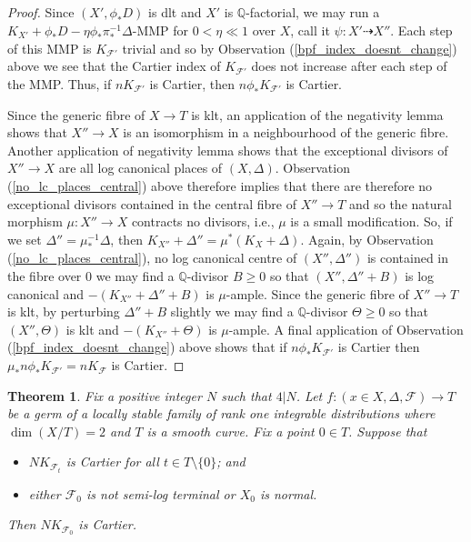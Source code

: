 \documentclass[12pt, a4paper]{amsart}
\newcounter{Theorem}
\newtheorem{theorem}{Theorem}[section]
\theoremstyle{definition}
\theoremstyle{named}
\begin{document}
\begin{proof}
Since $(X', \phi_*D)$ is dlt and $X'$ is $\mathbb Q$-factorial, 
we may run a $K_{X'}+\phi_*D - \eta\phi_*\pi_*^{-1}\Delta$-MMP for $0<\eta \ll 1$ over $X$, call it 
$\psi\colon X' \dashrightarrow X''$.  Each step of this MMP is $K_{\mathcal F'}$ trivial and so by Observation  (\ref{bpf_index_doesnt_change}) above we see that the Cartier index of $K_{\mathcal F'}$ does not increase after each step of the MMP.  Thus, if $nK_{\mathcal F'}$ is Cartier, then $n\phi_*K_{\mathcal F'}$ is Cartier.

Since the generic fibre of $X \to T$ is klt, an application of the negativity lemma shows that $X'' \to X$ is an isomorphism in a neighbourhood of the generic fibre.  Another application of negativity lemma shows that the exceptional divisors of $X'' \to X$ are all log canonical places of $(X, \Delta)$.  Observation (\ref{no_lc_places_central}) above therefore implies that there are therefore no exceptional divisors contained in the central fibre of $X'' \to T$ and so the natural morphism $\mu\colon X'' \to X$ contracts no divisors, i.e., $\mu$ is a small modification.  
So, if we set $\Delta'' = \mu_*^{-1}\Delta$, then $K_{X''}+\Delta'' = \mu^*(K_X+\Delta)$.  Again, by Observation (\ref{no_lc_places_central}), no log canonical centre of $(X'', \Delta'')$ is contained in the fibre over $0$ we may find a $\mathbb Q$-divisor $B \ge 0$ so that $(X'', \Delta''+B)$ is log canonical and $-(K_{X''}+\Delta''+B)$ is $\mu$-ample.  Since the generic fibre of $X'' \to T$ is klt, by perturbing $\Delta''+B$ slightly we may find a $\mathbb Q$-divisor $\Theta \ge 0$ so that $(X'', \Theta)$ is klt and $-(K_{X''}+\Theta)$ is $\mu$-ample.
A final application of Observation (\ref{bpf_index_doesnt_change}) above
shows that if $n\phi_*K_{\mathcal F'}$ is Cartier then 
$\mu_*n\phi_*K_{\mathcal F'} = nK_{\mathcal F}$ is Cartier.
\end{proof}







\begin{theorem}
\label{thm_index_is_stable}
Fix a positive integer $N$ such that $4|N$.
    Let $f\colon (x \in X, \Delta, \mathcal F) \rightarrow T$
    be a germ of a locally stable family of rank one integrable distributions where $\dim (X/T) = 2$ and $T$ is a smooth curve.  Fix a point $0 \in T$.  
    Suppose that 
    \begin{itemize}
        \item $NK_{\mathcal F_t}$ is Cartier for all $t \in T\setminus \{0\}$; and
        \item either $\mathcal F_0$ is not semi-log terminal or $X_0$ is normal.
    \end{itemize}

    
     Then $NK_{\mathcal F_0}$ is Cartier.   
\end{theorem}
\end{document}
